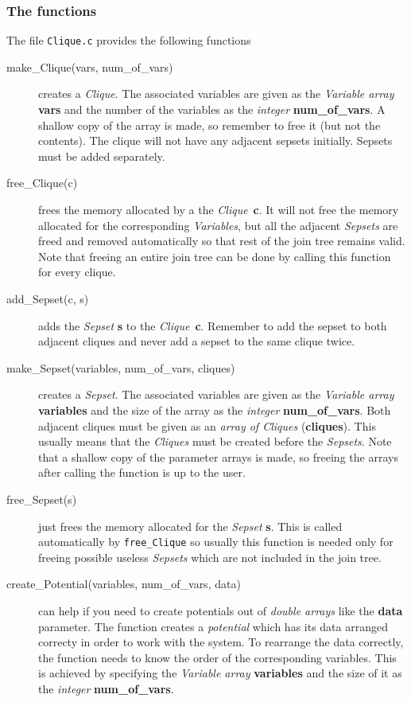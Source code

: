 \documentclass[12pt,a4paper]{report}
\newcommand{\cdatatype}[1]{{\it #1}}
\newcommand{\cfilename}[1]{\texttt{#1}}
\newcommand{\cparameter}[1]{\textbf{#1}}
\newcommand{\cfunction}[1]{\texttt{#1}}
\begin{document}
\subsubsection{The functions}
The file \cfilename{Clique.c} provides the following functions
\begin{description}
\item[make\_Clique(vars, num\_of\_vars)] creates a \cdatatype{Clique}. The
associated variables are given as the \cdatatype{Variable array}
\cparameter{vars} and the number of the variables as the \cdatatype{integer} 
\cparameter{num\_of\_vars}. A shallow copy of the array is made, so
remember to free it (but not the contents). The clique will not have 
any adjacent sepsets initially. Sepsets must be added separately.

\item[free\_Clique(c)] frees the memory allocated by a the 
\cdatatype{Clique}~\cparameter{c}. It will not free the memory allocated for 
the corresponding \cdatatype{Variables}, but all the adjacent 
\cdatatype{Sepsets} are freed and removed automatically so that rest
of the join tree remains valid. Note that freeing an entire join tree
can be done by calling this function for every clique.

\item[add\_Sepset(c, s)] adds the \cdatatype{Sepset} \cparameter{s} to the 
\cdatatype{Clique}~\cparameter{c}. Remember to add the sepset to both
adjacent cliques and never add a sepset to the same clique twice.

\item[make\_Sepset(variables, num\_of\_vars, cliques)] creates a {\it
Sepset}. The associated variables are given as the \cdatatype{Variable
array} \cparameter{variables} and the size of the array as the {\it
integer} \cparameter{num\_of\_vars}. Both adjacent cliques must be given
as an \cdatatype{array of Cliques} (\cparameter{cliques}). This
usually means that the \cdatatype{Cliques} must be created before the
\cdatatype{Sepsets}. Note that a shallow copy of the parameter arrays
is made, so freeing the arrays after calling the function is up to the user.

\item[free\_Sepset(s)] just frees the memory allocated for the
\cdatatype{Sepset} \cparameter{s}. This is called automatically by 
\cfunction{free\_Clique} so usually this function is needed only for
freeing possible useless \cdatatype{Sepsets} which are not included in the 
join tree.

\item[create\_Potential(variables, num\_of\_vars, data)] can help if
you need to create potentials out of \cdatatype{double arrays} like 
the \cparameter{data} parameter. The function creates a \cdatatype{potential} 
which has its data arranged correcty in order to work with the
system. To rearrange the data correctly, the function needs to know 
the order of the corresponding variables. This is achieved by 
specifying the \cdatatype{Variable array} \cparameter{variables} and the size 
of it as the \cdatatype{integer} \cparameter{num\_of\_vars}. 


\end{description}
\end{document}
